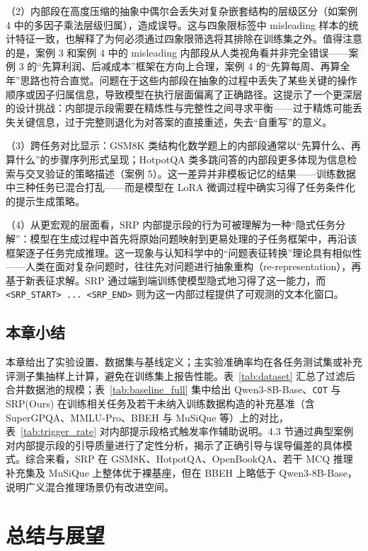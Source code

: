 （2）内部段在高度压缩的抽象中偶尔会丢失对复杂嵌套结构的层级区分（如案例 4 中的多因子乘法层级归属），造成误导。这与四象限标签中 misleading 样本的统计特征一致，也解释了为何必须通过四象限筛选将其排除在训练集之外。值得注意的是，案例 3 和案例 4 中的 misleading 内部段从人类视角看并非完全错误——案例 3 的“先算利润、后减成本”框架在方向上合理，案例 4 的“先算每周、再算全年”思路也符合直觉。问题在于这些内部段在抽象的过程中丢失了某些关键的操作顺序或因子归属信息，导致模型在执行层面偏离了正确路径。这提示了一个更深层的设计挑战：内部提示段需要在精炼性与完整性之间寻求平衡——过于精炼可能丢失关键信息，过于完整则退化为对答案的直接重述，失去“自重写”的意义。

（3）跨任务对比显示：GSM8K 类结构化数学题上的内部段通常以“先算什么、再算什么”的步骤序列形式呈现；HotpotQA 类多跳问答的内部段更多体现为信息检索与交叉验证的策略描述（案例 5）。这一差异并非模板记忆的结果——训练数据中三种任务已混合打乱——而是模型在 LoRA 微调过程中确实习得了任务条件化的提示生成策略。

（4）从更宏观的层面看，SRP 内部提示段的行为可被理解为一种“隐式任务分解”：模型在生成过程中首先将原始问题映射到更易处理的子任务框架中，再沿该框架逐子任务完成推理。这一现象与认知科学中的“问题表征转换”理论具有相似性——人类在面对复杂问题时，往往先对问题进行抽象重构（re-representation），再基于新表征求解。SRP 通过端到端训练使模型隐式地习得了这一能力，而 \texttt{<SRP\_START> ... <SRP\_END>} 则为这一内部过程提供了可观测的文本化窗口。

\section{本章小结}

本章给出了实验设置、数据集与基线定义；主实验准确率均在各任务测试集或补充评测子集抽样上计算，避免在训练集上报告性能。表~\ref{tab:dataset} 汇总了过滤后合并数据池的规模；表~\ref{tab:baseline_full} 集中给出 Qwen3-8B-Base、\texttt{COT} 与 SRP(Ours) 在训练相关任务及若干未纳入训练数据构造的补充基准（含 SuperGPQA、MMLU-Pro、BBEH 与 MuSiQue 等）上的对比，表~\ref{tab:trigger_rate} 对内部提示段格式触发率作辅助说明。4.3 节通过典型案例对内部提示段的引导质量进行了定性分析，揭示了正确引导与误导偏差的具体模式。综合来看，SRP 在 GSM8K、HotpotQA、OpenBookQA、若干 MCQ 推理补充集及 MuSiQue 上整体优于裸基座，但在 BBEH 上略低于 Qwen3-8B-Base，说明广义混合推理场景仍有改进空间。

\chapter{总结与展望}

